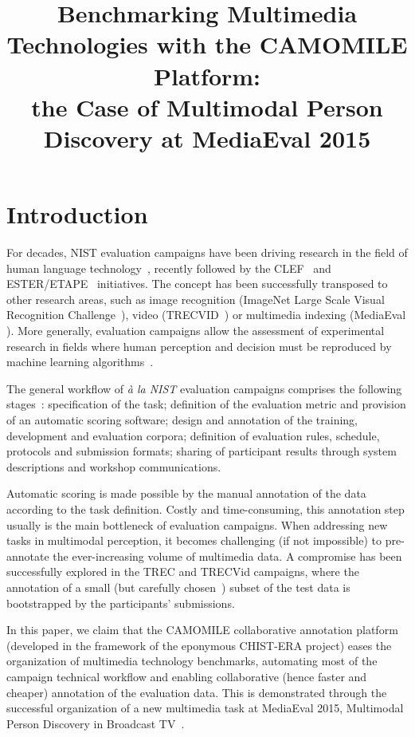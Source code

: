 \documentclass[10pt, a4paper]{article}
\title{Benchmarking Multimedia Technologies with the CAMOMILE Platform:\\the Case of Multimodal Person Discovery at MediaEval 2015}
\begin{document}
\maketitleabstract

\section{Introduction}

For decades, NIST evaluation campaigns have been driving research in the field
of human language technology~\cite{Martin2004}, recently followed by the CLEF~\cite{Peters2002} and
ESTER/ETAPE~\cite{Gravier2004} initiatives. The concept has been successfully transposed to
other research areas, such as image recognition (ImageNet Large Scale Visual
Recognition Challenge~\cite{Russakovsky2015}), video (TRECVID~\cite{Smeaton2006}) or multimedia indexing
(MediaEval \cite{Larson2015}). More generally, evaluation campaigns allow the assessment of
experimental research in fields where human perception and decision must be
reproduced by machine learning algorithms~\cite{Geoffrois2008}.

The general workflow of \textit{à la NIST} evaluation campaigns comprises the
following stages~\cite{Martin2004}: specification of the task; definition of the evaluation
metric and provision of an automatic scoring software; design and annotation of
the training, development and evaluation corpora; definition of evaluation
rules, schedule, protocols and submission formats; sharing of participant
results through system descriptions and workshop communications.

Automatic scoring is made possible by the manual annotation of the data
according to the task definition. Costly and time-consuming, this annotation
step usually is the main bottleneck of evaluation campaigns. When addressing
new tasks in multimodal perception, it becomes challenging (if not impossible)
to pre-annotate the ever-increasing volume of multimedia data. A compromise
has been successfully explored in the TREC and TRECVid campaigns, where
the annotation of a small (but carefully chosen~\cite{Yilmaz2006}) subset of the test data is
bootstrapped by the participants' submissions.

In this paper, we claim that the CAMOMILE collaborative annotation platform
(developed in the framework of the eponymous CHIST-ERA project) eases the
organization of multimedia technology benchmarks, automating most of the
campaign technical workflow and enabling collaborative (hence faster and
cheaper) annotation of the evaluation data. This is demonstrated through the
successful organization of a new multimedia task at MediaEval 2015, Multimodal
Person Discovery in Broadcast TV~\cite{Poignant2015}.
\end{document}
